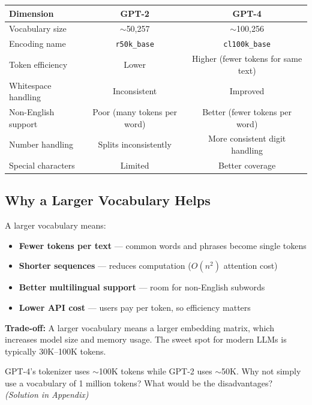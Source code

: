 \documentclass[11pt,a4paper]{article}
\begin{document}
\begin{center}
\renewcommand{\arraystretch}{1.4}
\begin{tabular}{@{}p{4cm}cc@{}}
\toprule
\textbf{Dimension} & \textbf{GPT-2} & \textbf{GPT-4} \\
\midrule
Vocabulary size & $\sim$50,257 & $\sim$100,256 \\
Encoding name & \texttt{r50k\_base} & \texttt{cl100k\_base} \\
Token efficiency & Lower & Higher (fewer tokens for same text) \\
Whitespace handling & Inconsistent & Improved \\
Non-English support & Poor (many tokens per word) & Better (fewer tokens per word) \\
Number handling & Splits inconsistently & More consistent digit handling \\
Special characters & Limited & Better coverage \\
\bottomrule
\end{tabular}
\end{center}

\subsection{Why a Larger Vocabulary Helps}

A larger vocabulary means:
\begin{itemize}[leftmargin=1.5em]
    \item \textbf{Fewer tokens per text} --- common words and phrases become single tokens
    \item \textbf{Shorter sequences} --- reduces computation ($O(n^2)$ attention cost)
    \item \textbf{Better multilingual support} --- room for non-English subwords
    \item \textbf{Lower API cost} --- users pay per token, so efficiency matters
\end{itemize}

\textbf{Trade-off:} A larger vocabulary means a larger embedding matrix, which increases model size and memory usage. The sweet spot for modern LLMs is typically 30K--100K tokens.

\begin{tcolorbox}[questionbox={Self-Check Q2}]
GPT-4's tokenizer uses $\sim$100K tokens while GPT-2 uses $\sim$50K. Why not simply use a vocabulary of 1 million tokens? What would be the disadvantages? \textit{(Solution in Appendix)}
\end{tcolorbox}
\end{document}

